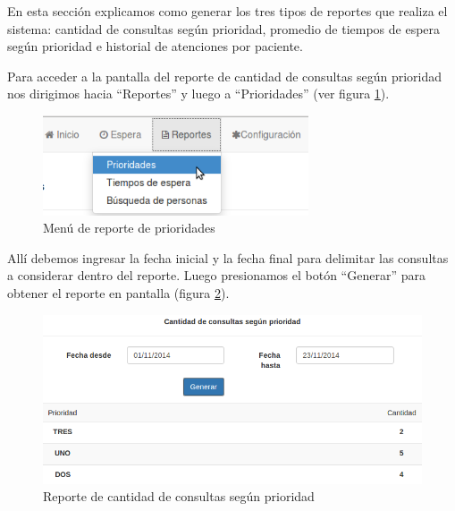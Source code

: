 En esta sección explicamos como generar los tres tipos de reportes que realiza el sistema: cantidad de consultas según prioridad, promedio de tiempos de espera según prioridad e historial de atenciones por paciente.

Para acceder a la pantalla del reporte de cantidad de consultas según prioridad nos dirigimos hacia ``Reportes'' y luego a ``Prioridades'' (ver figura \ref{fig:menu_reporte_prioridades}).
\begin{figure}
\centerline{\includegraphics[width=0.7\textwidth]{menu_reporte_prioridades.png}}
\caption{Menú de reporte de prioridades}
\label{fig:menu_reporte_prioridades}
\end{figure}
Allí debemos ingresar la fecha inicial y la fecha final para delimitar las consultas a considerar dentro del reporte. Luego presionamos el botón ``Generar'' para obtener el reporte en pantalla (figura \ref{fig:reporte_prioridades}).
\begin{figure}
\centerline{\includegraphics[width=1\textwidth]{reporte_prioridades.png}}
\caption{Reporte de cantidad de consultas según prioridad}
\label{fig:reporte_prioridades}
\end{figure}

